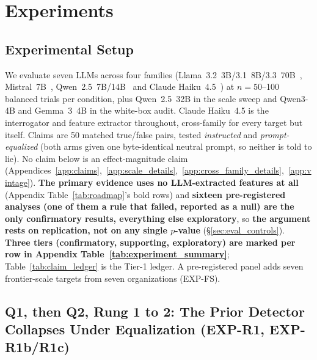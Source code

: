 \section{Experiments}
\label{sec:experiments}

\subsection{Experimental Setup}
\label{sec:setup}

We evaluate seven LLMs across four families (Llama~3.2~3B/3.1~8B/3.3~70B~\citep{meta2024llama3}, Mistral~7B~\citep{jiang2023mistral}, Qwen~2.5~7B/14B~\citep{qwen2025qwen25} and Claude Haiku~4.5~\citep{anthropic2025haiku45}) at $n=50$--100 balanced trials per condition, plus Qwen~2.5~32B in the scale sweep and Qwen3-4B and Gemma~3~4B in the white-box audit. Claude Haiku~4.5 is the interrogator and feature extractor throughout, cross-family for every target but itself. Claims are 50 matched true/false pairs, tested \emph{instructed} and \emph{prompt-equalized} (both arms given one byte-identical neutral prompt, so neither is told to lie). No claim below is an effect-magnitude claim (Appendices~\ref{app:claims},~\ref{app:scale_details},~\ref{app:cross_family_details},~\ref{app:vintage}). \textbf{The primary evidence uses no LLM-extracted features at all} (Appendix Table~\ref{tab:roadmap}'s bold rows) and \textbf{sixteen pre-registered analyses (one of them a rule that failed, reported as a null) are the only confirmatory results, everything else exploratory}, so \textbf{the argument rests on replication, not on any single $p$-value} (§\ref{sec:eval_controls}). \textbf{Three tiers (confirmatory, supporting, exploratory) are marked per row in Appendix Table~\ref{tab:experiment_summary}}; Table~\ref{tab:claim_ledger} is the Tier-1 ledger. A pre-registered panel adds seven frontier-scale targets from seven organizations (EXP-FS).

\subsection{Q1, then Q2, Rung 1 to 2: The Prior Detector Collapses Under Equalization (EXP-R1, EXP-R1b/R1c)}
\label{sec:r1_faithful}

